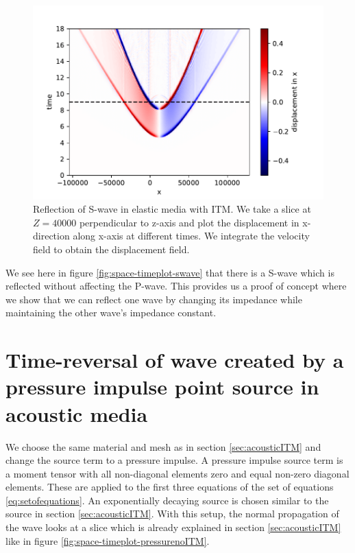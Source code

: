 \begin{figure}
    \centering
    \includegraphics[width=0.75\linewidth]{figures/swaveITMdisplacement.pdf}
    \caption{Reflection of S-wave in elastic media with \ac{ITM}. We take a slice at $Z=40000$ perpendicular to z-axis
    and plot the displacement in x-direction along x-axis at different times. We integrate the velocity field to obtain the displacement field.}
    \label{fig:space-timeplot-swavedisplacement}
\end{figure}



We see here in figure \ref{fig:space-timeplot-swave} that there is a S-wave which is reflected without affecting the P-wave. 
This provides us a proof of concept where we show that we can reflect one wave by changing its impedance while maintaining the other wave's impedance constant.

\section{Time-reversal of wave created by a pressure impulse point source in acoustic media}
We choose the same material and mesh as in section \ref{sec:acousticITM} and change the source term to a pressure impulse. A pressure impulse source term is a moment tensor
with all non-diagonal elements zero and equal non-zero diagonal elements. These are applied to the first three equations of the set of equations \ref{eq:setofequations}. 
An exponentially decaying source is chosen similar to the source in section \ref{sec:acousticITM}. With this setup, the normal propagation of the wave looks at a slice which is already explained in section \ref{sec:acousticITM}
like in figure \ref{fig:space-timeplot-pressurenoITM}.

